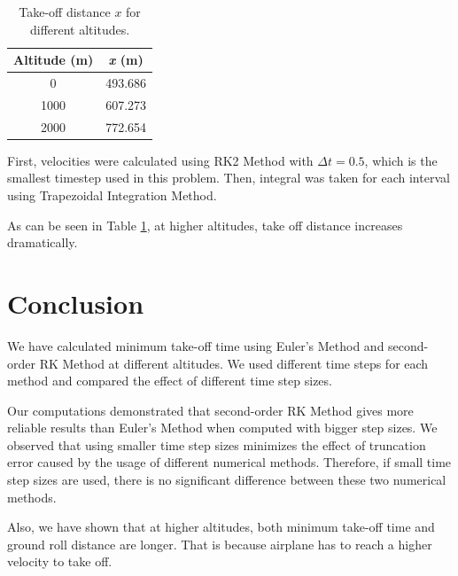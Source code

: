 \documentclass[letterpaper,12pt]{article}
\begin{document}
\begin{table}[!h]
        \begin{center}
        \caption{Take-off distance $x$ for different altitudes.}
        \vspace{1em}
        \label{tbl:takeoff}
        \begin{tabular}{|c|c|} 
        \hline
        \multicolumn{1}{|c|}{\bf{Altitude (m)}} & \multicolumn{1}{c|}{\bf{\textit{x} (m)}} \\
        \hline
        0 &   493.686 \\ \hline
        1000 &   607.273 \\ \hline
        2000 &   772.654 \\ \hline
        \end{tabular}
        \end{center}
        \end{table}

First, velocities were calculated using RK2 Method with $\Delta t = 0.5$, which is the smallest
timestep used in this problem. Then, integral was taken for each interval using Trapezoidal Integration Method.

As can be seen in Table \ref{tbl:takeoff}, at higher altitudes, take off distance increases dramatically.

\section{Conclusion}
We have calculated minimum take-off time using Euler's Method and second-order RK Method at different altitudes.
We used different time steps for each method and compared the effect of different time step sizes. 

Our computations demonstrated that second-order RK Method gives more reliable results than Euler's Method
when computed with bigger step sizes. We observed that using smaller time step sizes minimizes the effect of truncation error
caused by the usage of different numerical methods. Therefore, if small time step sizes are used, there is no 
significant difference between these two numerical methods.

Also, we have shown that at higher altitudes, both minimum take-off time and ground roll distance are longer.
That is because airplane has to reach a higher velocity to take off.
\end{document}
